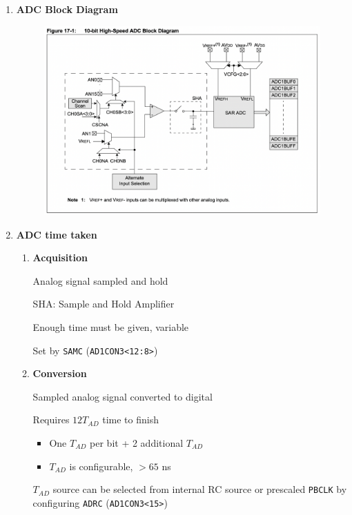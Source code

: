 \documentclass[a4paper]{article}
\begin{document}
\begin{enumerate}[label = \arabic*.]
    \item \textbf{ADC Block Diagram}
      \begin{figure}[H]
        \centering
        \includegraphics[width=0.9\linewidth]{ADC_block_diagram.png}
        \label{fig:ADC_block_diagram.png}
      \end{figure}

    \item \textbf{ADC time taken}
      \begin{enumerate}[label = \arabic*.]
        \item \textbf{Acquisition}
          \par Analog signal sampled and hold
          \par SHA\@: Sample and Hold Amplifier
          \par Enough time must be given, variable
          \par Set by \verb|SAMC| (\verb|AD1CON3<12:8>|)
        \item \textbf{Conversion}
          \par Sampled analog signal converted to digital
          \par Requires \( 12 T_{AD}  \) time to finish
          \begin{itemize}[leftmargin = 1cm]
            \item One \( T_{AD}  \) per bit + 2 additional \( T_{AD} \)
            \item \( T_{AD} \) is configurable, \( > 65 \) ns
          \end{itemize}
          \( T_{AD} \) source can be selected from internal RC source or prescaled \verb|PBCLK| by configuring \verb|ADRC| (\verb|AD1CON3<15>|)
      \end{enumerate}


\end{enumerate}
\end{document}
